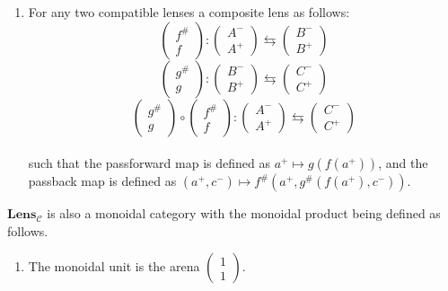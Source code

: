 \documentclass[12pt]{article}
\begin{document}
\begin{definition*}{}{}
    \begin{enumerate}
        \item For any two compatible lenses a composite lens as follows:
              $$\begin{pmatrix}f^{\#}\\f\end{pmatrix}:\begin{pmatrix}A^-\\A^+\end{pmatrix}\leftrightarrows\begin{pmatrix}B^-\\B^+\end{pmatrix}$$
              $$\begin{pmatrix}g^{\#}\\g\end{pmatrix}:\begin{pmatrix}B^-\\B^+\end{pmatrix}\leftrightarrows\begin{pmatrix}C^-\\C^+\end{pmatrix}$$
              $$\begin{pmatrix}g^{\#}\\g\end{pmatrix} \circ \begin{pmatrix}f^{\#}\\f\end{pmatrix}:\begin{pmatrix}A^-\\A^+\end{pmatrix}\leftrightarrows\begin{pmatrix}C^-\\C^+\end{pmatrix}$$
              \\such that the passforward map is defined as $a^+ \mapsto g(f(a^+))$,
              and the passback map is defined as $(a^+, c^-) \mapsto f^\#(a^+, g^\#(f(a^+), c^-))$.
    \end{enumerate}
    $\textbf{Lens}_{\mathcal{C}}$ is also a monoidal category with the monoidal product being defined as follows.
    \begin{enumerate}
        \item The monoidal unit is the arena $\begin{pmatrix}1\\1\end{pmatrix}$.

\end{enumerate}
\end{definition*}
\end{document}
